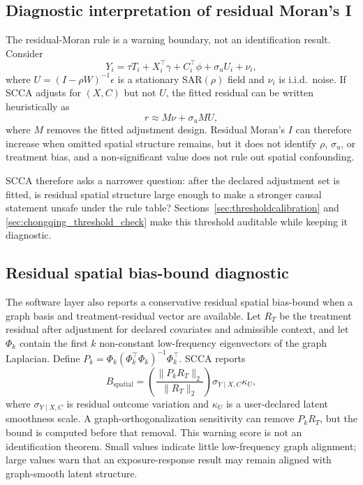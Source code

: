 \documentclass{article}
\begin{document}
\subsection{Diagnostic interpretation of residual Moran's I}
\label{sec:residual_diagnostic}

The residual-Moran rule is a warning boundary, not an identification result. Consider
\begin{equation}
Y_i = \tau T_i + X_i^\top \gamma + C_i^\top \phi + \sigma_u U_i + \nu_i,
\end{equation}
where $U = (I - \rho W)^{-1}\epsilon$ is a stationary SAR$(\rho)$ field and $\nu_i$ is i.i.d.\ noise. If SCCA adjusts for $(X,C)$ but not $U$, the fitted residual can be written heuristically as
\begin{equation}
r \approx M\nu + \sigma_u M U,
\end{equation}
where $M$ removes the fitted adjustment design. Residual Moran's $I$ can therefore increase when omitted spatial structure remains, but it does not identify $\rho$, $\sigma_u$, or treatment bias, and a non-significant value does not rule out spatial confounding.

SCCA therefore asks a narrower question: after the declared adjustment set is fitted, is residual spatial structure large enough to make a stronger causal statement unsafe under the rule table? Sections~\ref{sec:thresholdcalibration} and \ref{sec:chongqing_threshold_check} make this threshold auditable while keeping it diagnostic.

\subsection{Residual spatial bias-bound diagnostic}

The software layer also reports a conservative residual spatial bias-bound when a graph basis and treatment-residual vector are available. Let $R_T$ be the treatment residual after adjustment for declared covariates and admissible context, and let $\Phi_k$ contain the first $k$ non-constant low-frequency eigenvectors of the graph Laplacian. Define $P_k = \Phi_k(\Phi_k^\top\Phi_k)^{-1}\Phi_k^\top$. SCCA reports
\begin{equation}
B_{\mathrm{spatial}} =
\left(\frac{\|P_k R_T\|_2}{\|R_T\|_2}\right)
\sigma_{Y\mid X,C}\kappa_U,
\end{equation}
where $\sigma_{Y\mid X,C}$ is residual outcome variation and $\kappa_U$ is a user-declared latent smoothness scale. A graph-orthogonalization sensitivity can remove $P_kR_T$, but the bound is computed before that removal. This warning score is not an identification theorem. Small values indicate little low-frequency graph alignment; large values warn that an exposure-response result may remain aligned with graph-smooth latent structure.
\end{document}
